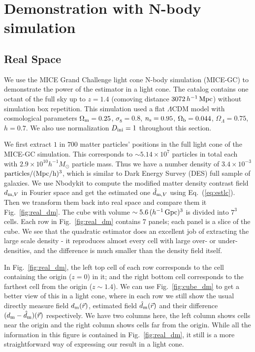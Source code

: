 \documentclass[prd,amsmath,amssymb,floatfix,superscriptaddress,nofootinbib,twocolumn]{revtex4-1}
\newcommand{\ini}{\rm ini}
\newcommand{\vrr}{\vec{r}}
\newcommand{\ec}[1]{Eq.~(\ref{eq:#1})}
\newcommand{\rf}[1]{\ref{fig:#1}}
\begin{document}
\section{Demonstration with N-body simulation} \label{sec6}
\subsection{Real Space}
\noindent We use the MICE Grand Challenge light cone N-body simulation (MICE-GC) to demonstrate the power of the estimator in a light cone. The catalog contains one octant of the full sky up to $z = 1.4$ (comoving distance $3072\, h^{-1}\, \rm Mpc$) without simulation box repetition. This simulation used a flat $\Lambda$CDM model with cosmological parameters $ \Omega_{\rm m}=0.25$, $\sigma_8 = 0.8$, $n_{\rm s}=0.95$, $\Omega_{\rm b}=0.044$, $\Omega_{\Lambda}=0.75$, $h=0.7$. We also use normalization $D_{\ini}=1$ throughout this section. 

We first extract $1$ in $700$  matter particles' positions in the full light cone of the MICE-GC simulation. This corresponds to $\sim 5.14\times 10^{7}$ particles in total each with $2.9\times 10^{10} h^{-1}M_{\odot}$ particle mass. Thus we have a number density of $3.4\times 10^{-3}$ $\rm particles/(Mpc/h)^3$, which is similar to Dark Energy Survey (DES) \cite{DES:2016DES} full sample of galaxies. We use Nbodykit \cite{Hand:2018nby} to compute the modified matter density contrast field $d_{{\rm m},V}$ in Fourier space and get the estimated one $\hat d_{{\rm m},V}$ using \ec{estlc}. Then we transform them back into real space and compare them it Fig.~\rf{real_dm}. The cube with volume $\sim5.6\,(h^{-1}\,\rm Gpc)^3$ is divided into $7^3$ cells. Each row in Fig.~\rf{real_dm} contains 7 panels; each panel is a slice of the cube. We see that the quadratic estimator does an excellent job of extracting the large scale density - it reproduces almost every cell with large over- or under-densities, and the difference is much smaller than the density field itself.

In Fig.~\rf{real_dm}, the left top cell of each row corresponds to the cell containing the origin ($z=0$) in it; and the right bottom cell corresponds to the farthest cell from the origin ($z\sim 1.4$). We can use Fig.~\rf{cube_dm} to get a better view of this in a light cone, where in each row we still show the usual directly measure field $d_{\rm m}(\vrr)$, estimated field $\hat{d}_{\rm m}(\vrr)$ and their difference $(d_{\rm m}-\hat{d}_{\rm m})(\vrr)$ respectively. We have two columns here, the left column shows cells near the origin and the right column shows cells far from the origin. While all the information in this figure is contained in Fig.~\rf{real_dm}, it still is a more straightforward way of expressing our result in a light cone. 
\end{document}
